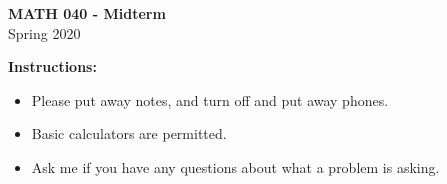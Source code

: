 \addpoints
\setlength{\parindent}{0cm}

\begin{center}

{\Large\textbf{MATH 040 - Midterm}}\\
\medskip
{\Large{Spring 2020}}

\vskip1cm
\vskip0.4cm
\vskip0.4cm

\vskip0.4cm

\end{center}
\bigskip
\textbf{Instructions:}
\begin{itemize}
  \item Please put away notes, and turn off and put away phones.
  \item Basic calculators are permitted.
  \item Ask me if you have any questions about what a problem is asking.
\end{itemize}
\vskip0.4cm
\begin{center}
  \gradetable[h][questions]
\end{center}

\newpage
\vskip1cm
